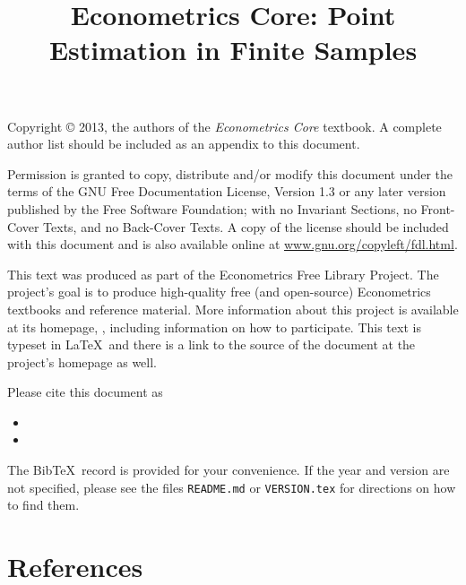\documentclass{tex/tufte-handout}
\title{Econometrics Core: Point Estimation in Finite Samples}
\begin{document}
\maketitle

\bigskip\noindent%
Copyright © 2013, the authors of the \textit{Econometrics Core}
textbook.  A complete author list should be included as an appendix to
this document.

Permission is granted to copy, distribute and/or modify this document
under the terms of the GNU Free Documentation License, Version 1.3 or
any later version published by the Free Software Foundation; with no
Invariant Sections, no Front-Cover Texts, and no Back-Cover Texts.  A
copy of the license should be included with this document and is also
available online at \url{www.gnu.org/copyleft/fdl.html}.

This text was produced as part of the Econometrics Free Library
Project.  The project's goal is to produce high-quality free (and
open-source) Econometrics textbooks and reference material.  More
information about this project is available at its homepage,
\homepage, including information on how
to participate.  This text is typeset in \LaTeX\ and there is a link
to the source of the document at the project's homepage as well.

Please cite this document as
\begin{itemize}
\item[] 
\item[] 
\end{itemize}
The Bib\!\TeX\ record is provided for your convenience.
If the year and version are not specified, please see the files
\texttt{README.md} or \texttt{VERSION.tex} for directions on how to
find them.

\tableofcontents









\part*{References}%

\end{document}
